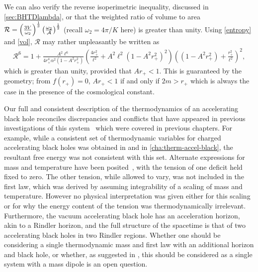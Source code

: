 \documentclass[
twoside,
openright,
frontopenright,
]{dmathesis}
\begin{document}
We can also verify the reverse isoperimetric inequality, discussed in \cref{sec:BHTDlambda}, or that the weighted ratio of volume to
area $\mathcal{R}=\left( \frac{3{V}}{\omega _{2}}\right)^{\frac{1}{3}}
\left(\frac{\omega _{2}}{{\cal A}}\right) ^{\frac{1}{2}}$ (recall $\omega_2=4\pi/K$
here) is greater than unity. Using \cref{entropy} and \cref{vol}, $\mathcal{R}$
may rather unpleasantly be written as
\begin{align}
  \mathcal{R}^6 = 1 + \frac{A^2\ell^6}{4r_+^4\alpha^2(1-A^2r_+^2)}
  \left(\frac{4r_+^2}{\ell^2} 
  + A^2 \ell^2 (1-A^2 r_+^2)^2\right)
  \left((1-A^2r_+^2)+\frac{r_+^2}{\ell^2}\right)^2, 
\end{align}
which is greater than unity, provided that $Ar_+<1$. This is guaranteed by the
geometry; from $f(r_+) = 0$, $Ar_+<1$ if and only if $2m > r_+$ which is always
the case in the presence of the cosmological constant.

Our full and consistent description of the thermodynamics of an accelerating
black hole reconciles discrepancies and conflicts that have appeared in previous
investigations of this system~\cite{Appels:2016uha,
  Appels:2017xoe,Astorino:2016ybm} which were covered in previous chapters.  For
example, while a consistent set of thermodynamic variables for charged
accelerating black holes was obtained in
\cite{Appels:2016uha,Appels:2017xoe,Gregory:2017ogk} and in
\cref{cha:therm-accel-black}, the resultant free energy was not consistent with
this set.  Alternate expressions for mass and temperature have been
posited~\cite{Astorino:2016ybm}, with the tension of one deficit held fixed to
zero.  The other tension, while allowed to vary, was not included in the first
law, which was derived by assuming integrability of a scaling of mass and
temperature.  However no physical interpretation was given either for this
scaling or for why the energy content of the tension was thermodynamically
irrelevant.  Furthermore, the vacuum accelerating black hole has an acceleration
horizon, akin to a Rindler horizon, and the full structure of the spacetime is
that of two accelerating black holes in two Rindler regions. Whether one should
be considering a single thermodynamic mass and first law with an additional
horizon and black hole, or whether, as suggested in \cite{Dutta:2005iy}, this
should be considered as a single system with a mass dipole is an open question.
\end{document}
